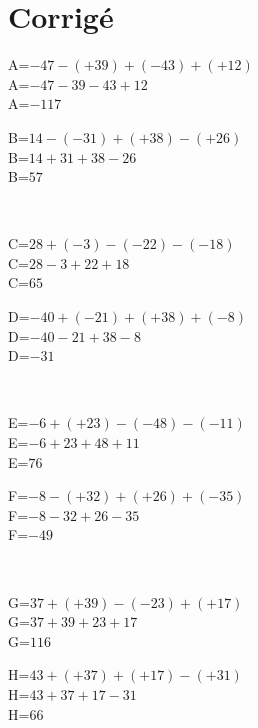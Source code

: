 \documentclass{article}%
\begin{document}
\section{Corrigé}%
\label{sec:Corrig}%
\begin{minipage}{0.5\textwidth}%
A=$-47-(+39)+(-43)+(+12)$\\%
A=$-47-39-43+12$\\%
A=$-117$\\%
\end{minipage}%
\begin{minipage}{0.5\textwidth}%
B=$14-(-31)+(+38)-(+26)$\\%
B=$14+31+38-26$\\%
B=$57$\\%
\end{minipage}%
\\%
\begin{minipage}{0.5\textwidth}%
C=$28+(-3)-(-22)-(-18)$\\%
C=$28-3+22+18$\\%
C=$65$\\%
\end{minipage}%
\begin{minipage}{0.5\textwidth}%
D=$-40+(-21)+(+38)+(-8)$\\%
D=$-40-21+38-8$\\%
D=$-31$\\%
\end{minipage}%
\\%
\begin{minipage}{0.5\textwidth}%
E=$-6+(+23)-(-48)-(-11)$\\%
E=$-6+23+48+11$\\%
E=$76$\\%
\end{minipage}%
\begin{minipage}{0.5\textwidth}%
F=$-8-(+32)+(+26)+(-35)$\\%
F=$-8-32+26-35$\\%
F=$-49$\\%
\end{minipage}%
\\%
\begin{minipage}{0.5\textwidth}%
G=$37+(+39)-(-23)+(+17)$\\%
G=$37+39+23+17$\\%
G=$116$\\%
\end{minipage}%
\begin{minipage}{0.5\textwidth}%
H=$43+(+37)+(+17)-(+31)$\\%
H=$43+37+17-31$\\%
H=$66$\\%
\end{minipage}%
\end{document}
